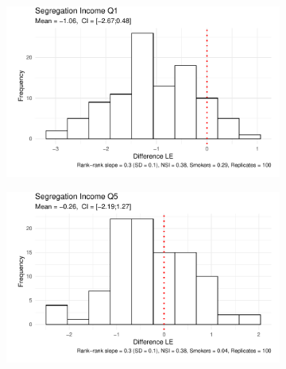 \begin{figure}[htp]
     
    \begin{subfigure}[b]{0.50\textwidth}
         \centering
         \includegraphics[width=\textwidth]{plots/microsimulation/microsimulation_3_1.pdf}
     \end{subfigure}%
     \begin{subfigure}[b]{0.50\textwidth}
         \centering
         \includegraphics[width=\textwidth]{plots/microsimulation/microsimulation_3_5.pdf}
     \end{subfigure}
     
\end{figure}